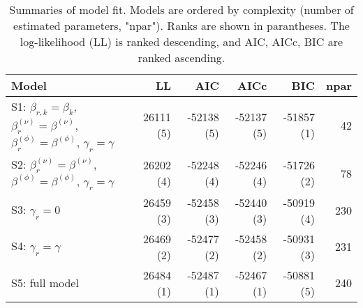 \begin{table}[ht]
\centering
\begingroup\fontsize{9pt}{10pt}\selectfont
\begin{tabular}{l|rrrrr}
  \hline
Model & LL & AIC & AICc & BIC & npar \\ 
  \hline
S1: $\beta_{r,k} = \beta_{k}$, $\beta_{r}^{(\nu)} = \beta^{(\nu)}$, $\beta_{r}^{(\phi)} = \beta^{(\phi)}$, $\gamma_r = \gamma$ & 26111 (5) & -52138 (5) & -52137 (5) & -51857 (1) & 42 \\ 
  S2: $\beta_{r}^{(\nu)} = \beta^{(\nu)}$, $\beta^{(\phi)} = \beta^{(\phi)}$, $\gamma_r = \gamma$ & 26202 (4) & -52248 (4) & -52246 (4) & -51726 (2) & 78 \\ 
  S3: $\gamma_r = 0$ & 26459 (3) & -52458 (3) & -52440 (3) & -50919 (4) & 230 \\ 
  S4: $\gamma_r = \gamma$ & 26469 (2) & -52477 (2) & -52458 (2) & -50931 (3) & 231 \\ 
  S5: full model & 26484 (1) & -52487 (1) & -52467 (1) & -50881 (5) & 240 \\ 
   \hline
\end{tabular}
\endgroup
\caption{Summaries of model fit.
             Models are ordered by complexity (number of estimated parameters, "npar").
             Ranks are shown in parantheses.
             The log-likelihood (LL) is ranked descending,
             and AIC, AICc, BIC are ranked ascending.} 
\label{tab:mBetafit}
\end{table}

